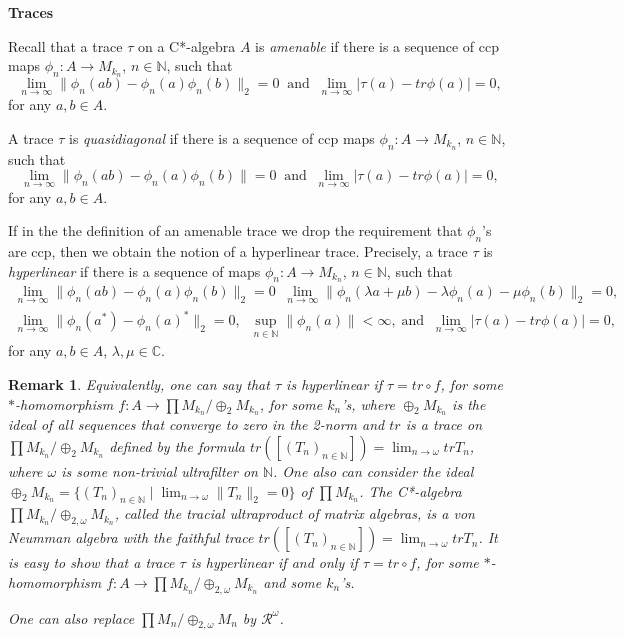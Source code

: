 \documentclass{article}%
\newtheorem{remark}[theorem]{Remark}
\begin{document}
\bigskip

{\bf Traces}

\medskip

Recall that a trace $\tau$ on a C*-algebra $A$ is {\it amenable} if there is a sequence of   ccp maps $\phi_n: A \to M_{k_n}$, $n\in \mathbb N$, such that
$$ \lim_{n\to \infty} \|\phi_n(ab)- \phi_n(a)\phi_n(b)\|_2=0 \;\; \text{and} \;\; \lim_{n\to \infty}|\tau(a)- tr \phi(a)|=0,$$ for any $a, b\in A$.

A trace $\tau$ is {\it quasidiagonal} if there is a sequence of   ccp maps $\phi_n: A \to M_{k_n}$, $n\in \mathbb N$, such that
$$ \lim_{n\to \infty} \|\phi_n(ab)- \phi_n(a)\phi_n(b)\|=0 \;\; \text{and} \;\; \lim_{n\to \infty}|\tau(a)- tr \phi(a)|=0,$$  for any $a, b\in A$.

If in the the definition of an amenable trace we drop the requirement that  $\phi_n$'s are ccp, then we obtain the notion of a hyperlinear trace. Precisely, a trace $\tau$ is {\it hyperlinear} if there is a sequence of  maps $\phi_n: A \to M_{k_n}$, $n\in \mathbb N$, such that
\begin{multline*}  \lim_{n\to \infty} \|\phi_n(ab)- \phi_n(a)\phi_n(b)\|_2=0 \;\; \lim_{n\to \infty}\|\phi_n(\lambda a+\mu b)- \lambda\phi_n(a)-\mu \phi_n(b)\|_2 =0, \\ \lim_{n\to \infty} \|\phi_n(a^*) - \phi_n(a)^*\|_2=0,\;\; \sup_{n\in \mathbb N} \|\phi_n(a)\|<\infty, \;\text{and} \;\; \lim_{n\to \infty}|\tau(a)- tr \phi(a)|=0,\end{multline*} for any $a, b\in A$, $\lambda, \mu\in \mathbb C$.


 \begin{remark}\label{hypTraceReformulation} Equivalently, one can say that $\tau$ is {\it hyperlinear}  if $\tau = tr\circ f$, for some $\ast$-homomorphism $f: A \to \prod M_{k_n}/\oplus_2 M_{k_n}$, for some $k_n$'s,  where $\oplus_2 M_{k_n}$ is the ideal of all sequences that converge to zero in the 2-norm and $tr$ is a  trace on $\prod M_{k_n}/\oplus_2 M_{k_n}$ defined by the formula
 $tr([(T_n)_{n\in \mathbb N}]) = \lim_{n\to \omega} tr T_n$, where $\omega$ is some non-trivial ultrafilter on $\mathbb N$. One also can consider the ideal $\oplus_2 M_{k_n} = \{(T_n)_{n\in \mathbb N}\;|\; \lim_{n\to \omega} \|T_n\|_2 = 0\}$ of $\prod M_{k_n}$. The C*-algebra $\prod M_{k_n}/\oplus_{2, \omega} M_{k_n}$, called  the tracial ultraproduct of matrix algebras,  is a von Neumman algebra with the faithful trace $tr([(T_n)_{n\in \mathbb N}]) = \lim_{n\to \omega} tr T_n$. It is easy to show that a trace $\tau$ is hyperlinear if and only if $\tau = tr\circ f$, for some $\ast$-homomorphism $f: A \to \prod M_{k_n}/\oplus_{2, \omega} M_{k_n}$ and some $k_n$'s.

\noindent One can also replace  $\prod M_n/\oplus_{2, \omega} M_{n}$ by $\mathcal R^{\omega}$.
\end{remark}
\end{document}

